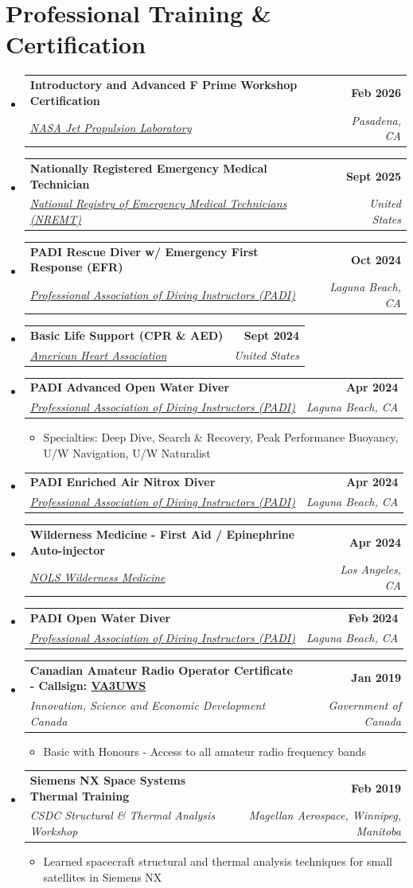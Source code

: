 \documentclass[letterpaper,11pt]{article}
\makeatletter
\newcommand{\resumeItem}[1]{
  \item\small{
    {#1 \vspace{-2pt}}
  }
}
\newcommand{\resumeSubheading}[4]{
  \vspace{-2pt}\item
    \begin{tabular*}{1.0\textwidth}[t]{l@{\extracolsep{\fill}}r}
      \textbf{#1} & \textbf{\small #2} \\
      \textit{\small#3} & \textit{\small #4} \\
    \end{tabular*}\vspace{-7pt}
}
\newcommand{\resumeSubHeadingListStart}{\begin{itemize}[leftmargin=0.0in, label={}]}
\newcommand{\resumeSubHeadingListEnd}{\end{itemize}}
\newcommand{\resumeItemListStart}{\begin{itemize}}
\newcommand{\resumeItemListEnd}{\end{itemize}\vspace{-5pt}}
\newcommand{\shiftleft}[2]{\makebox[0pt][r]{\makebox[#1][l]{#2}}}
\newcommand{\cvIcon}[1]{\BeginAccSupp{ActualText={}}#1\EndAccSupp{}}
\def\shiftleft#1#2{}%
\def\faCertificate{}%
\makeatother
\begin{document}
\section[Professional Training \& Certification]{\shiftleft{18pt}{\cvIcon{\faCertificate}}Professional Training \& Certification}
  \resumeSubHeadingListStart
    \resumeSubheading
      {Introductory and Advanced F Prime Workshop Certification}{Feb 2026}
      {\href{https://fprime.jpl.nasa.gov/}{NASA Jet Propulsion Laboratory}}{Pasadena, CA}
    \resumeSubheading
      {Nationally Registered Emergency Medical Technician}{Sept 2025}
      {\href{https://www.nremt.org/}{National Registry of Emergency Medical Technicians (NREMT)}}{United States}
    \resumeSubheading
      {PADI Rescue Diver w/ Emergency First Response (EFR)}{Oct 2024}
      {\href{https://www.padi.com/}{Professional Association of Diving Instructors (PADI)}}{Laguna Beach, CA}
    \resumeSubheading
      {Basic Life Support (CPR \& AED)}{Sept 2024}
      {\href{https://cpr.heart.org/en/cpr-courses-and-kits/healthcare-professional/basic-life-support-bls-training}{American Heart Association}}{United States}
    \resumeSubheading
      {PADI Advanced Open Water Diver}{Apr 2024}
      {\href{https://www.padi.com/}{Professional Association of Diving Instructors (PADI)}}{Laguna Beach, CA}
      \resumeItemListStart
        \resumeItem{Specialties: Deep Dive, Search \& Recovery, Peak Performance Buoyancy, U/W Navigation, U/W Naturalist}
      \resumeItemListEnd
    \resumeSubheading
      {PADI Enriched Air Nitrox Diver}{Apr 2024}
      {\href{https://www.padi.com/}{Professional Association of Diving Instructors (PADI)}}{Laguna Beach, CA}
    \resumeSubheading
      {Wilderness Medicine - First Aid / Epinephrine Auto-injector}{Apr 2024}
      {\href{https://www.nols.edu/en/wilderness-medicine/why-nols/}{NOLS Wilderness Medicine}}{Los Angeles, CA}
    \resumeSubheading
      {PADI Open Water Diver}{Feb 2024}
      {\href{https://www.padi.com/}{Professional Association of Diving Instructors (PADI)}}{Laguna Beach, CA}
    \resumeSubheading
      {Canadian Amateur Radio Operator Certificate - Callsign: \href{https://bit.ly/atilla-saadat-callsign}{VA3UWS}}{Jan 2019}
      {Innovation, Science and Economic Development Canada}{Government of Canada}
      \resumeItemListStart
        \resumeItem{Basic with Honours - Access to all amateur radio frequency bands}
      \resumeItemListEnd
    \resumeSubheading
      {Siemens NX Space Systems Thermal Training}{Feb 2019}
      {CSDC Structural \& Thermal Analysis Workshop}{Magellan Aerospace, Winnipeg, Manitoba}
      \resumeItemListStart
        \resumeItem{Learned spacecraft structural and thermal analysis techniques for small satellites in Siemens NX}
      \resumeItemListEnd
  \resumeSubHeadingListEnd
\vspace{-5pt}
\end{document}
